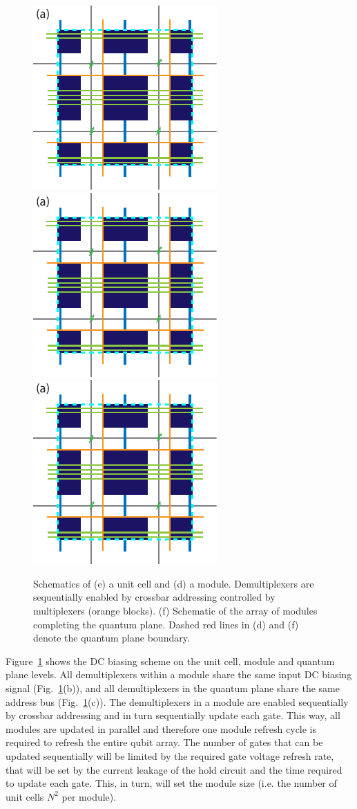\documentclass[aps,prl,reprint,superscriptaddress,floatfix]{revtex4-1}
\begin{document}
\begin{figure}[t]
    \centering
    \includegraphics[height=0.275\textwidth,page=1]{Figure_4_DC_biasing_2.pdf}
    \includegraphics[height=0.275\textwidth,page=2]{Figure_4_DC_biasing_2.pdf}
    \includegraphics[height=0.275\textwidth,page=3]{Figure_4_DC_biasing_2.pdf}
    \caption{Schematics of (e) a unit cell and (d) a module. Demultiplexers are sequentially enabled by crossbar addressing controlled by multiplexers (orange blocks). (f) Schematic of the array of modules completing the quantum plane. Dashed red lines in (d) and (f) denote the quantum plane boundary.}
    \label{fig:dc_biasing_2}
\end{figure}

Figure~\ref{fig:dc_biasing_2} shows the DC biasing scheme on the unit cell, module and quantum plane levels.
All demultiplexers within a module share the same input DC biasing signal (Fig.~\ref{fig:dc_biasing_2}(b)), and all demultiplexers in the quantum plane share the same address bus (Fig.~\ref{fig:dc_biasing_2}(c)).
The demultiplexers in a module are enabled sequentially by crossbar addressing and in turn sequentially update each gate. This way, all modules are updated in parallel and therefore one module refresh cycle is required to refresh the entire qubit array.
The number of gates that can be updated sequentially will be limited by the required gate voltage refresh rate, that will be set by the current leakage of the hold circuit and the time required to update each gate.
This, in turn, will set the module size (i.e. the number of unit cells $N^2$ per module).
\end{document}
